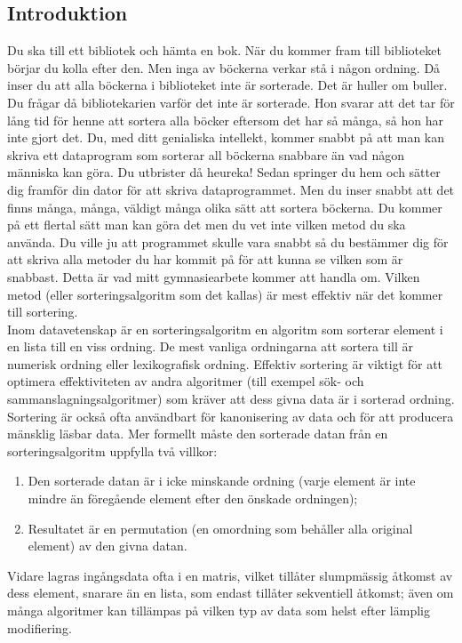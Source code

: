 \documentclass[twocolumn, a4]{article}
\begin{document}
\subsection{Introduktion}
Du ska till ett bibliotek och hämta en bok. När du kommer fram till biblioteket börjar du kolla efter den. Men inga av böckerna verkar stå i någon ordning. Då inser du att alla böckerna i biblioteket inte är sorterade. Det är huller om buller. Du frågar då bibliotekarien varför det inte är sorterade. Hon svarar att det tar för lång tid för henne att sortera alla böcker eftersom det har så många, så hon har inte gjort det. Du, med ditt genialiska intellekt, kommer snabbt på att man kan skriva ett dataprogram som sorterar all böckerna snabbare än vad någon människa kan göra. Du utbrister då heureka! Sedan springer du hem och sätter dig framför din dator för att skriva dataprogrammet. Men du inser snabbt att det finns många, många, väldigt många olika sätt att sortera böckerna. Du kommer på ett flertal sätt man kan göra det men du vet inte vilken metod du ska använda. Du ville ju att programmet skulle vara snabbt så du bestämmer dig för att skriva alla metoder du har kommit på för att kunna se vilken som är snabbast. Detta är vad mitt gymnasiearbete kommer att handla om. Vilken metod (eller sorteringsalgoritm som det kallas) är mest effektiv när det kommer till sortering.\\
Inom datavetenskap är en sorteringsalgoritm en algoritm som sorterar element i en lista till en viss ordning. De mest vanliga ordningarna att sortera till är numerisk ordning eller lexikografisk ordning. Effektiv sortering är viktigt för att optimera effektiviteten av andra algoritmer (till exempel sök- och sammanslagningsalgoritmer) som kräver att dess givna data är i sorterad ordning. Sortering är också ofta användbart för kanonisering av data och för att producera mänsklig läsbar data. Mer formellt måste den sorterade datan från en sorteringsalgoritm uppfylla två villkor:\cite{1, 2}
\begin{enumerate}
    \item Den sorterade datan är i icke minskande ordning (varje element är inte mindre än föregående element efter den önskade ordningen);
    \item Resultatet är en permutation (en omordning som behåller alla original element) av den givna datan.
\end{enumerate}
Vidare lagras ingångsdata ofta i en matris, vilket tillåter slumpmässig åtkomst av dess element, snarare än en lista, som endast tillåter sekventiell åtkomst; även om många algoritmer kan tillämpas på vilken typ av data som helst efter lämplig modifiering.\\
\end{document}
